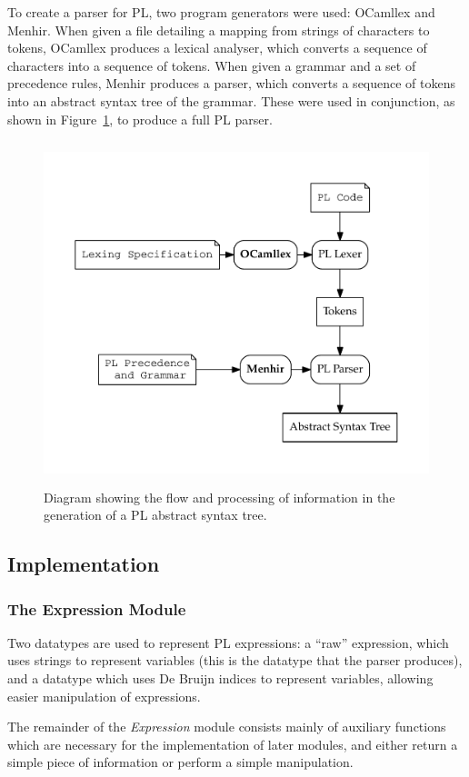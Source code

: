 \documentclass[12pt,a4paper,twoside,openright]{report}
\begin{document}
To create a parser for PL, two program generators were used:
OCamllex and Menhir. When given a
file detailing a mapping from strings of characters to tokens,
OCamllex produces a lexical analyser, which converts a sequence
of characters into a sequence of tokens. When given a
grammar and a set of precedence rules, Menhir produces a parser,
which converts a sequence of tokens into an abstract syntax tree
of the grammar. These were used in conjunction, as shown in
Figure~\ref{fig:parsing}, to produce a full PL parser.

\begin{figure}
	\centering
	\includegraphics[height=10cm]{parsing}
	\caption{Diagram showing the flow and processing of
		information in the generation of a PL abstract
		syntax tree.}
	\label{fig:parsing}
\end{figure}

\subsection{Implementation}

\subsubsection{The Expression Module}
Two datatypes are used to
represent PL expressions: a ``raw'' expression, which
uses strings to represent variables (this is the
datatype that the parser produces), and a datatype
which uses De Bruijn indices \cite{debr72} to
represent variables, allowing
easier manipulation of expressions.

The remainder of the \emph{Expression} module
consists mainly of auxiliary functions which are
necessary for the implementation of later
modules, and either return a simple piece
of information or perform a simple manipulation.
\end{document}
